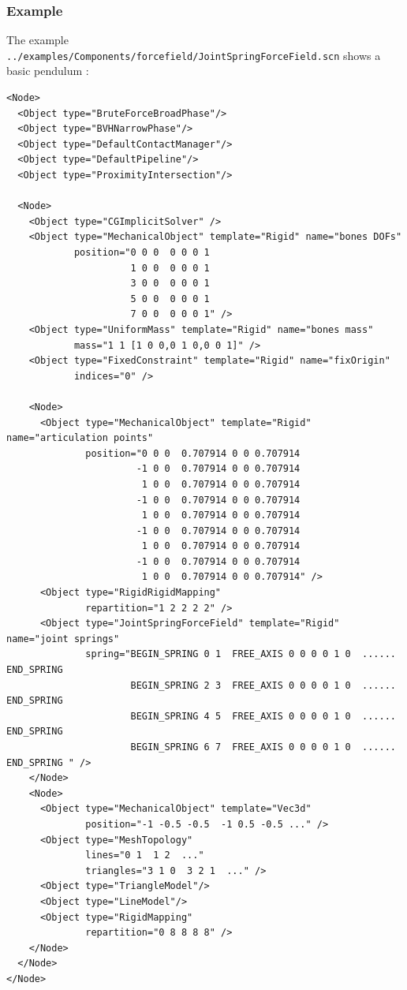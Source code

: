 \subsubsection {Example}

The example \texttt{../examples/Components/forcefield/JointSpringForceField.scn} shows a basic pendulum :

\begin{verbatim}
<Node>
  <Object type="BruteForceBroadPhase"/>
  <Object type="BVHNarrowPhase"/>
  <Object type="DefaultContactManager"/>
  <Object type="DefaultPipeline"/>
  <Object type="ProximityIntersection"/>

  <Node>
    <Object type="CGImplicitSolver"	/>
    <Object type="MechanicalObject" template="Rigid" name="bones DOFs"
            position="0 0 0  0 0 0 1 
                      1 0 0  0 0 0 1 
                      3 0 0  0 0 0 1 
                      5 0 0  0 0 0 1 
                      7 0 0  0 0 0 1" />
    <Object type="UniformMass" template="Rigid" name="bones mass"
            mass="1 1 [1 0 0,0 1 0,0 0 1]" />
    <Object type="FixedConstraint" template="Rigid" name="fixOrigin"
            indices="0" />
		
    <Node>
      <Object type="MechanicalObject" template="Rigid" name="articulation points"
              position="0 0 0  0.707914 0 0 0.707914 
                       -1 0 0  0.707914 0 0 0.707914 
                        1 0 0  0.707914 0 0 0.707914 
                       -1 0 0  0.707914 0 0 0.707914 
                        1 0 0  0.707914 0 0 0.707914 
                       -1 0 0  0.707914 0 0 0.707914 
                        1 0 0  0.707914 0 0 0.707914 
                       -1 0 0  0.707914 0 0 0.707914 
                        1 0 0  0.707914 0 0 0.707914" />
      <Object type="RigidRigidMapping"
              repartition="1 2 2 2 2" />
      <Object type="JointSpringForceField" template="Rigid" name="joint springs"
              spring="BEGIN_SPRING 0 1  FREE_AXIS 0 0 0 0 1 0  ......  END_SPRING 
                      BEGIN_SPRING 2 3  FREE_AXIS 0 0 0 0 1 0  ......  END_SPRING 
                      BEGIN_SPRING 4 5  FREE_AXIS 0 0 0 0 1 0  ......  END_SPRING 
                      BEGIN_SPRING 6 7  FREE_AXIS 0 0 0 0 1 0  ......  END_SPRING " />
    </Node>
    <Node>
      <Object type="MechanicalObject" template="Vec3d"
              position="-1 -0.5 -0.5  -1 0.5 -0.5 ..." />
      <Object type="MeshTopology"
              lines="0 1  1 2  ..."
              triangles="3 1 0  3 2 1  ..." />
      <Object type="TriangleModel"/>
      <Object type="LineModel"/>
      <Object type="RigidMapping"
              repartition="0 8 8 8 8" />
    </Node>
  </Node>
</Node>

\end{verbatim}

